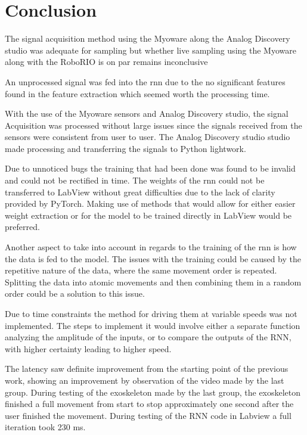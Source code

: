 \section{Conclusion}

The signal acquisition method using the Myoware along the Analog Discovery studio was adequate for sampling but whether live sampling using the Myoware along with the RoboRIO is on par remains inconclusive 

An unprocessed signal was fed into the \acrshort{rnn} due to the no significant features found in the feature extraction which seemed worth the processing time.


With the use of the Myoware sensors and Analog Discovery studio, the signal Acquisition was processed without large issues since the signals received from the sensors were consistent from user to user. 
The Analog Discovery studio studio made processing and transferring the signals to Python lightwork.

Due to unnoticed bugs the training that had been done was found to be invalid and could not be rectified in time.
The weights of the \acrshort{rnn} could not be transferred to LabView without great difficulties due to the lack of clarity provided by
PyTorch. Making use of methods that would allow for either easier weight extraction or for the model to be trained
directly in LabView would be preferred.

Another aspect to take into account in regards to the training of the \acrshort{rnn} is how the data is fed to the model. The issues
with the training could be caused by the repetitive nature of the data, where the same movement order is repeated. Splitting the data
into atomic movements and then combining them in a random order could be a solution to this issue.

Due to time constraints the method for driving them at variable speeds was not implemented. The steps to implement it
would involve either a separate function analyzing the amplitude of the inputs, or to compare the outputs of the RNN,
with higher certainty leading to higher speed.

The latency saw definite improvement from the starting point of the previous work, showing an improvement by observation of the video made by the last group. During testing of the exoskeleton made by the last group,
the exoskeleton finished a full movement from start to stop approximately one second after the user finished the movement. During testing of the RNN code in Labview a full iteration took 230 ms.
